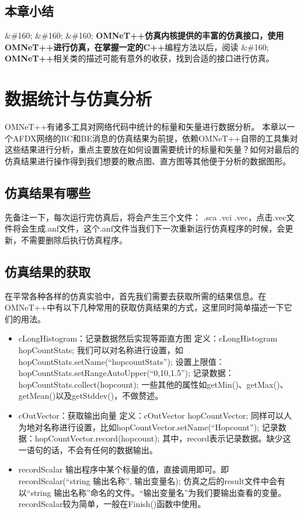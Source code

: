 \section{本章小结}
\label{本章小结}

\&\#160; \&\#160; \&\#160; \textbf{OMNeT++\textbf{仿真内核提供的丰富的仿真接口，使用}OMNeT++\textbf{进行仿真，在掌握一定的}C++}编程方法以后，阅读 \&\#160; \textbf{OMNeT++}相关类的描述可能有意外的收获，找到合适的接口进行仿真。

\chapter{数据统计与仿真分析}
\label{数据统计与仿真分析}

OMNeT++有诸多工具对网络代码中统计的标量和矢量进行数据分析。
本章以一个AFDX网络的RC和BE消息的仿真结果为前提，依赖OMNeT++自带的工具集对这些结果进行分析，重点主要放在如何设置需要统计的标量和矢量？如何对最后的仿真结果进行操作得到我们想要的散点图、直方图等其他便于分析的数据图形。

\section{仿真结果有哪些}
\label{仿真结果有哪些}

先备注一下，每次运行完仿真后，将会产生三个文件：
.sca .vci .vec，点击.vec文件将会生成.anf文件，这个.anf文件当我们下一次重新运行仿真程序的时候，会更新，不需要删除后执行仿真程序。

\section{仿真结果的获取}
\label{仿真结果的获取}

在平常各种各样的仿真实验中，首先我们需要去获取所需的结果信息。在OMNeT++中有以下几种常用的获取仿真结果的方式，这里同时简单描述一下它们的用法。

\begin{itemize}
\item cLongHistogram：记录数据然后实现等距直方图 
定义：cLongHistogram hopCountStats;
我们可以对名称进行设置，如hopCountStats.setName(“hopcountStats”);
设置上限值：hopCountStats.setRangeAutoUpper(“0,10,1.5”);
记录数据：hopCountStats.collect(hopcount);
一些其他的属性如getMin()、getMax()、getMean()以及getStddev()，不做赘述。

\item cOutVector：获取输出向量
定义：cOutVector hopCountVector;
同样可以人为地对名称进行设置，比如hopCountVector.setName(“Hopcount”);
记录数据：hopCountVector.record(hopcount);
其中，record表示记录数据。缺少这一语句的话，不会有任何的数据输出。

\item recordScalar
输出程序中某个标量的值，直接调用即可。即
recordScalar(“string 输出名称”, 输出变量名);
仿真之后的result文件中会有以“string 输出名称”命名的文件。“输出变量名”为我们要输出查看的变量。recordScalar较为简单，一般在Finish()函数中使用。

\end{itemize}

